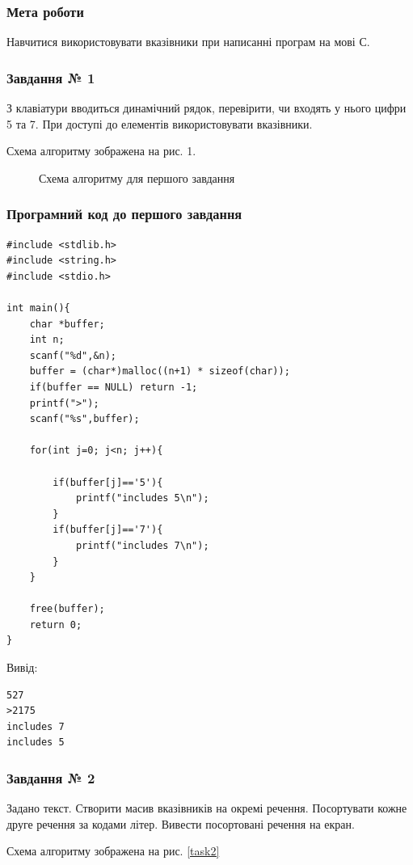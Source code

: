 \documentclass[12pt]{extreport}
\begin{document}


\subsubsection*{Мета роботи}
Навчитися використовувати вказівники при написанні програм на мові С.

\subsubsection*{Завдання № 1}
З клавіатури вводиться динамічний рядок, перевірити,
чи входять у нього цифри 5 та 7. При доступі до
елементів використовувати вказівники.

\bigskip
Схема алгоритму зображена на рис. 1.

\begin{figure}[h]
	\centering
	
	\caption{Схема алгоритму для першого завдання}
\end{figure}

\subsubsection*{Програмний код до першого завдання}

\begin{lstlisting}[frame=single]
#include <stdlib.h>
#include <string.h>
#include <stdio.h>

int main(){
  	char *buffer;
	int n;
	scanf("%d",&n);
	buffer = (char*)malloc((n+1) * sizeof(char));
	if(buffer == NULL) return -1;
	printf(">");
	scanf("%s",buffer);

	for(int j=0; j<n; j++){

		if(buffer[j]=='5'){
			printf("includes 5\n");
		}
		if(buffer[j]=='7'){
			printf("includes 7\n");
		}
	}

	free(buffer);
	return 0;
}
\end{lstlisting}

Вивід:
\begin{lstlisting}
527
>2175
includes 7
includes 5
\end{lstlisting}

\subsubsection*{Завдання № 2}
Задано текст. Створити масив вказівників на окремі речення. Посортувати
кожне друге речення за кодами літер. Вивести посортовані речення на екран.

\bigskip
Схема алгоритму зображена на рис. \ref{task2}
\end{document}
